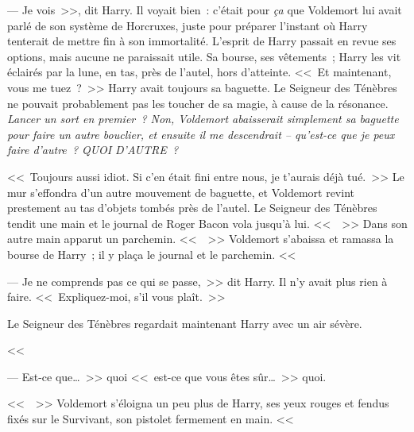 --- Je vois~>>, dit Harry. Il voyait bien~: c'était pour \emph{ça} que Voldemort lui avait parlé de son système de Horcruxes, juste pour préparer l'instant où Harry tenterait de mettre fin à son immortalité. L'esprit de Harry passait en revue ses options, mais aucune ne paraissait utile. Sa bourse, ses vêtements~; Harry les vit éclairés par la lune, en tas, près de l'autel, hors d'atteinte. <<~Et maintenant, vous me tuez~?~>> Harry avait toujours sa baguette. Le Seigneur des Ténèbres ne pouvait probablement pas les toucher de sa magie, à cause de la résonance. \emph{Lancer un sort en premier~? Non, Voldemort abaisserait simplement sa baguette pour faire un autre bouclier, et ensuite il me descendrait -- qu'est-ce que je peux faire d'autre~? QUOI D'AUTRE~?}

<<~Toujours aussi idiot. Si c'en était fini entre nous, je t'aurais déjà tué.~>> Le mur s'effondra d'un autre mouvement de baguette, et Voldemort revint prestement au tas d'objets tombés près de l'autel. Le Seigneur des Ténèbres tendit une main et le journal de Roger Bacon vola jusqu'à lui. <<~~>> Dans son autre main apparut un parchemin. <<~~>> Voldemort s'abaissa et ramassa la bourse de Harry~; il y plaça le journal et le parchemin. <<~

--- Je ne comprends pas ce qui se passe,~>> dit Harry. Il n'y avait plus rien à faire. <<~Expliquez-moi, s'il vous plaît.~>>

Le Seigneur des Ténèbres regardait maintenant Harry avec un air sévère.

<<~

--- Est-ce que…~>> quoi <<~est-ce que vous êtes sûr…~>> quoi.

<<~~>> Voldemort s'éloigna un peu plus de Harry, ses yeux rouges et fendus fixés sur le Survivant, son pistolet fermement en main. <<~

